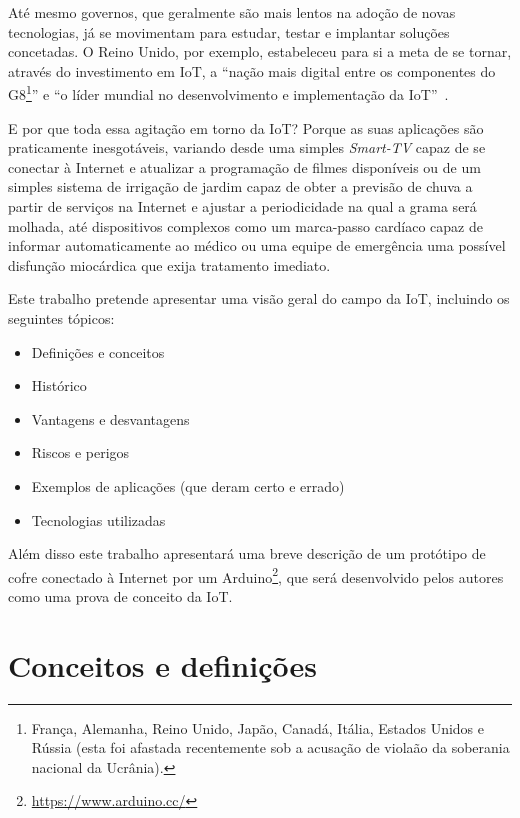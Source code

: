 \documentclass[pdftex, brazil, 12pt, twoside]{article}
\newcommand{\ingles}[1]{\textit{#1}}
\begin{document}
Até mesmo governos, que geralmente são mais lentos na adoção de novas tecnologias, já
se movimentam para estudar, testar e implantar soluções concetadas. O Reino Unido,
por exemplo, estabeleceu para si a meta de se tornar, através do investimento em IoT,
a ``nação mais digital entre os componentes do G8\footnote{França, Alemanha, Reino Unido,
  Japão, Canadá, Itália, Estados Unidos e Rússia (esta foi afastada recentemente sob
  a acusação de violaão da soberania nacional da Ucrânia).}'' e 
``o líder mundial no desenvolvimento e implementação da IoT''~\citep{UKGOSWalportIoT2014}.

E por que toda essa agitação em torno da IoT? Porque as suas aplicações
são praticamente inesgotáveis, variando desde uma simples
\ingles{Smart-TV} capaz de se conectar à Internet e atualizar a programação de
filmes disponíveis ou de um simples sistema de irrigação de jardim capaz de
obter a previsão de chuva a partir de serviços na Internet e ajustar a periodicidade
na qual a grama será molhada, até dispositivos complexos como um marca-passo cardíaco
capaz de informar automaticamente ao médico ou uma equipe de emergência uma possível
disfunção miocárdica que exija tratamento imediato.

Este trabalho pretende apresentar uma visão geral do campo da IoT, incluindo os
seguintes tópicos:

\begin{itemize}[noitemsep]
\item Definições e conceitos
\item Histórico
\item Vantagens e desvantagens
\item Riscos e perigos
\item Exemplos de aplicações (que deram certo e errado)
\item Tecnologias utilizadas
\end{itemize}

Além disso este trabalho apresentará uma breve descrição de um protótipo de
cofre conectado à Internet por um Arduino\footnote{\url{https://www.arduino.cc/}},
que será desenvolvido pelos autores como uma prova de conceito da IoT.


\section{Conceitos e definições}
\label{conceitos}
\end{document}
